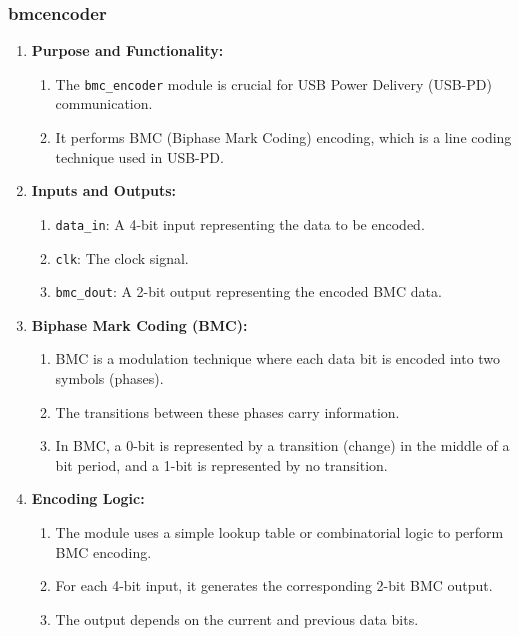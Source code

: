 \subsubsection{bmc\textunderscore encoder}
\begin{enumerate}
    \item \textbf{Purpose and Functionality:}
    \begin{enumerate}
        \item The \texttt{bmc\_encoder} module is crucial for USB Power Delivery (USB-PD) communication.
        \item It performs BMC (Biphase Mark Coding) encoding, which is a line coding technique used in USB-PD.
    \end{enumerate}

    \item \textbf{Inputs and Outputs:}
    \begin{enumerate}
        \item \texttt{data\_in}: A 4-bit input representing the data to be encoded.
        \item \texttt{clk}: The clock signal.
        \item \texttt{bmc\_dout}: A 2-bit output representing the encoded BMC data.
    \end{enumerate}

    \item \textbf{Biphase Mark Coding (BMC):}
    \begin{enumerate}
        \item BMC is a modulation technique where each data bit is encoded into two symbols (phases).
        \item The transitions between these phases carry information.
        \item In BMC, a 0-bit is represented by a transition (change) in the middle of a bit period, and a 1-bit is represented by no transition.
    \end{enumerate}

    \item \textbf{Encoding Logic:}
    \begin{enumerate}
        \item The module uses a simple lookup table or combinatorial logic to perform BMC encoding.
        \item For each 4-bit input, it generates the corresponding 2-bit BMC output.
        \item The output depends on the current and previous data bits.
    \end{enumerate}


\end{enumerate}
